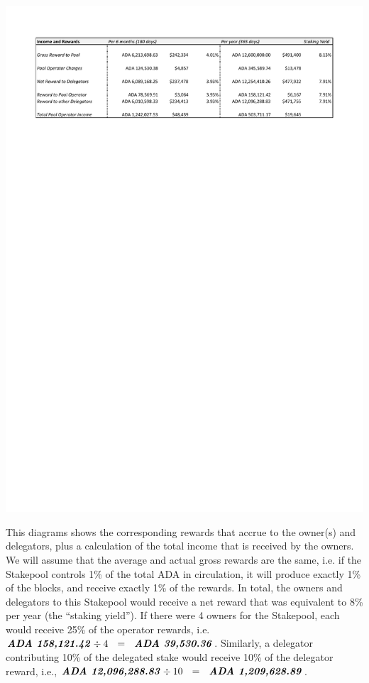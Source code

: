 \documentclass[11pt,a4paper,dvipsnames,twosided]{article}
\newcommand{\ada}{ADA{}}
\newcommand{\ADA}[1]{\textbf{\emph{\ada~{#1}}}}
\begin{document}
\begin{minipage}{\textwidth}
  \includegraphics[width=1.2\textwidth]{RC4.pdf}
\end{minipage}

\noindent
This diagrams shows the corresponding rewards that accrue to the owner(s) and delegators,
plus a calculation of the total income that is received by the owners.  We will assume that the average
and actual gross rewards are the same, i.e. if the Stakepool controls 1\% of the total \ada{} in
circulation, it will produce exactly 1\% of the blocks, and receive exactly 1\% of the rewards.
In total, the
owners and delegators to this Stakepool would receive a net reward that was equivalent to 8\% per year
(the ``staking yield'').  If there were 4 owners for the Stakepool, each would receive
25\% of the operator rewards, i.e. $\ADA{158,121.42} \div 4 ~~=~~ \ADA{39,530.36}$.
Similarly, a delegator contributing 10\% of the delegated stake would receive 10\% of
the delegator reward, i.e., $\ADA{12,096,288.83} \div 10 ~~=~~ \ADA{1,209,628.89}$.
\end{document}

